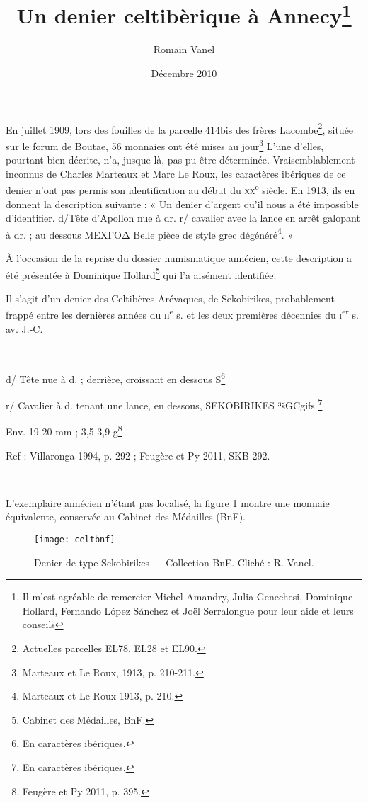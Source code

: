 \documentclass[a4paper,11pt]{article}
\title{Un denier celtibèrique à Annecy\footnote{Il m’est agréable de remercier Michel Amandry, Julia Genechesi, Dominique Hollard, Fernando López Sánchez et Joël Serralongue pour leur aide et leurs conseils}}
\date{Décembre 2010}
\author{Romain Vanel}
\begin{document}
\maketitle
\thispagestyle{fancy}




En juillet 1909, lors des fouilles de la parcelle 414bis des frères 
Lacombe\footnote{Actuelles parcelles EL78, EL28 et EL90.}, située sur le forum de
 Boutae, 56 monnaies ont été mises au jour\footnote{Marteaux et Le Roux, 1913, p. 210-211.}
L’une d’elles, pourtant bien décrite, n’a, jusque là, pas pu être déterminée. 
Vraisemblablement inconnus de Charles Marteaux et Marc Le Roux, les caractères ibériques
 de ce denier n’ont pas permis son identification au début du \textsc{xx}\textsuperscript{e} siècle.
 En 1913, ils en donnent la description suivante : « Un denier
 d’argent qu’il nous a été impossible d’identifier. d/Tête d’Apollon nue à dr.
 r/ cavalier avec la lance en arrêt galopant à dr. ; au dessous ΜΕΧΓΟΔ Belle
 pièce de style grec dégénéré\footnote{Marteaux et Le Roux 1913, p. 210.}. »

À l’occasion de la reprise du dossier numismatique annécien, cette description
 a été présentée à Dominique Hollard\footnote{Cabinet des Médailles, BnF.} qui l’a aisément identifiée.

Il s’agit d’un denier des Celtibères Arévaques, de Sekobirikes, probablement frappé entre les dernières années du
\textsc{ii}\textsuperscript{e} s. et les deux premières décennies du \textsc{i}\textsuperscript{er} s. av. J.-C.

~

d/ Tête nue à d. ; derrière, croissant en dessous S\footnote{En caractères ibériques.}

r/ Cavalier à d. tenant une lance, en dessous, SEKOBIRIKES {\celtib ³šGCgiƒs} \footnote{En caractères ibériques.}

Env. 19-20 mm ; 3,5-3,9 g\footnote{Feugère et Py 2011, p. 395.}

Ref : Villaronga 1994, p. 292 ; Feugère et Py 2011, SKB-292.

~

L’exemplaire annécien n’étant pas localisé, la figure 1 montre une monnaie
équivalente, conservée au Cabinet des Médailles (BnF).


\begin{figure}[!h]
\texttt{[image: celtbnf]}
\centering
\caption{Denier de type Sekobirikes --- Collection BnF. Cliché : R. Vanel.}
\end{figure}
\end{document}
